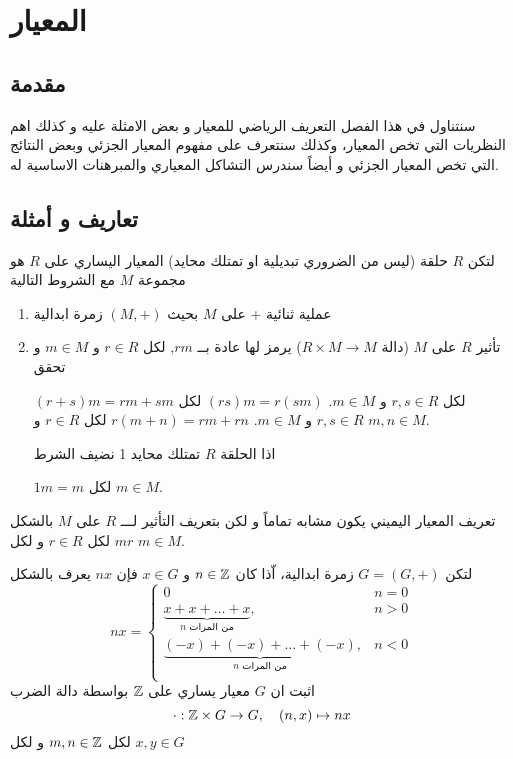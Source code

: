\chapter{المعيار}

\section*{مقدمة}
سنتناول في هذا الفصل التعريف الرياضي للمعيار و بعض الامثلة عليه و كذلك اهم النظريات التي تخص المعيار، وكذلك سنتعرف على مفهوم المعيار الجزئي وبعض النتائج التي تخص المعيار الجزئي و أيضاً سندرس التشاكل المعياري والمبرهنات الاساسية له.

\section{تعاريف و أمثلة}

\begin{definition}
	لتكن $R$ حلقة (ليس من الضروري تبديلية او تمتلك محايد) المعيار اليساري على $R$ هو مجموعة $M$ مع الشروط التالية
	\begin{enumerate}
		\item عملية ثنائية + على $M$ بحيث $(M, +)$ زمرة ابدالية
		\item تأثير $R$ على $M$ (دالة $R\times M \to M$) يرمز لها عادة بــ $rm$, لكل $r\in R$ و $m\in M$ و تحقق
		\begin{tasks}
			\task $(r+s)m = rm + sm$ لكل $r,s\in R$ و $m\in M$.
			\task $(rs)m=r(sm)$ لكل $r,s\in R$ و $m\in M$.
			\task $r(m+n) = rm+rn$ لكل $r\in R$ و $m,n\in M$.
		\end{tasks}
		اذا الحلقة $R$ تمتلك محايد 1 نضيف الشرط
		\begin{tasks}[resume]
			\task $1m = m$ لكل $m\in M$.
		\end{tasks}
	\end{enumerate}
\end{definition}

تعريف المعيار اليميني يكون مشابه تماماً و لكن بتعريف التأثير لـــ $R$ على $M$ بالشكل $mr$  لكل $r\in R$ و لكل $m\in M$.

\begin{example}\label{ex:modules}
	لتكن $G=(G, +)$ زمرة ابدالية، اّذا كان $n\in\mathbb{Z}$ و $x\in G$ فإن $nx$ يعرف بالشكل 
\[
nx = 
\begin{cases}
	0 & n=0 \\
	\underbrace{x+x+\dots+x}_{\text{$n$ من المرات}}, & n>0\\
	\underbrace{(-x)+(-x)+\dots+(-x)}_{\text{$n$ من المرات}}, & n<0\\
\end{cases}
\]
	اثبت ان $G$ معيار يساري على $\mathbb{Z}$ بواسطة دالة الضرب
	\[
	\cdot : \mathbb{Z}\times G \to G, \quad (n,x) \mapsto nx
	\]
	لكل $m,n\in \mathbb{Z}$ و لكل $x,y\in G$
\end{example}

